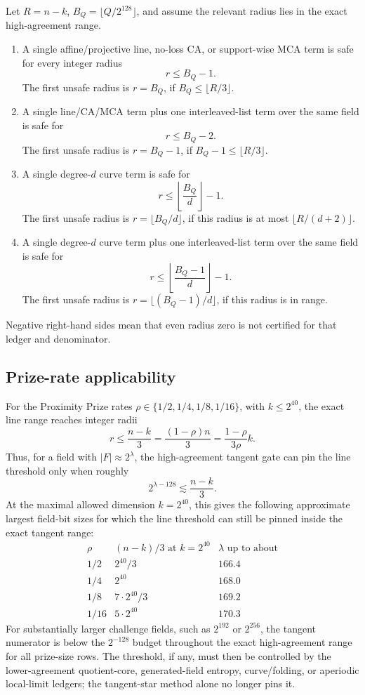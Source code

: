 \begin{corollary}
\label{cor:row-independent-gates}
Let \(R=n-k\), \(B_Q=\lfloor Q/2^{128}\rfloor\), and assume the relevant radius
lies in the exact high-agreement range.
\begin{enumerate}
\item A single affine/projective line, no-loss CA, or support-wise MCA term is
safe for every integer radius
\[
  r\le B_Q-1 .
\]
The first unsafe radius is \(r=B_Q\), if \(B_Q\le\lfloor R/3\rfloor\).
\item A single line/CA/MCA term plus one interleaved-list term over the same
field is safe for
\[
  r\le B_Q-2 .
\]
The first unsafe radius is \(r=B_Q-1\), if \(B_Q-1\le\lfloor R/3\rfloor\).
\item A single degree-\(d\) curve term is safe for
\[
  r\le \left\lfloor \frac{B_Q}{d}\right\rfloor-1 .
\]
The first unsafe radius is \(r=\lfloor B_Q/d\rfloor\), if this radius is at most
\(\lfloor R/(d+2)\rfloor\).
\item A single degree-\(d\) curve term plus one interleaved-list term over the
same field is safe for
\[
  r\le \left\lfloor \frac{B_Q-1}{d}\right\rfloor-1 .
\]
The first unsafe radius is \(r=\lfloor(B_Q-1)/d\rfloor\), if this radius is in
range.
\end{enumerate}
Negative right-hand sides mean that even radius zero is not certified for that
ledger and denominator.
\end{corollary}

\subsection{Prize-rate applicability}

For the Proximity Prize rates \(\rho\in\{1/2,1/4,1/8,1/16\}\), with
\(k\le2^{40}\), the exact line range reaches integer radii
\[
  r\le \frac{n-k}{3}=\frac{(1-\rho)n}{3}=\frac{1-\rho}{3\rho}k .
\]
Thus, for a field with \(|F|\approx2^\lambda\), the high-agreement tangent gate
can pin the line threshold only when roughly
\[
  2^{\lambda-128}\lesssim \frac{n-k}{3} .
\]
At the maximal allowed dimension \(k=2^{40}\), this gives the following
approximate largest field-bit sizes for which the line threshold can still be
pinned inside the exact tangent range:
\[
\begin{array}{c|c|c}
\rho & (n-k)/3\text{ at }k=2^{40} & \lambda\text{ up to about}\\
\hline
1/2  & 2^{40}/3      & 166.4\\
1/4  & 2^{40}        & 168.0\\
1/8  & 7\cdot2^{40}/3 & 169.2\\
1/16 & 5\cdot2^{40} & 170.3
\end{array}
\]
For substantially larger challenge fields, such as \(2^{192}\) or \(2^{256}\),
the tangent numerator is below the \(2^{-128}\) budget throughout the exact
high-agreement range for all prize-size rows.  The threshold, if any, must then
be controlled by the lower-agreement quotient-core, generated-field entropy,
curve/folding, or aperiodic local-limit ledgers; the tangent-star method alone
no longer pins it.
